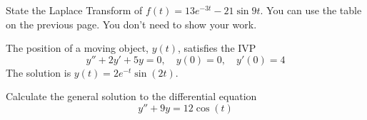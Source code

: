 \documentclass[12pt]{exam}
\begin{document}
\begin{questions}


    \question[4]  State the Laplace Transform of $f(t) = 13e^{-3t}-21\sin 9t$. You can use the table on the previous page. You don't need to show your work. 

    \vspace{5cm}

    \question[8] The position of a moving object, $y(t)$, satisfies the IVP $$y''+2y'+5y=0, \quad y(0) = 0, \quad y'(0) = 4$$ The solution is $y(t)= 2e^{-t}\sin(2t)$. 

    \newpage
    
    \question[8] Calculate the general solution to the differential equation $$y'' + 9y = 12\cos(t)$$ 


\end{questions}
\end{document}
